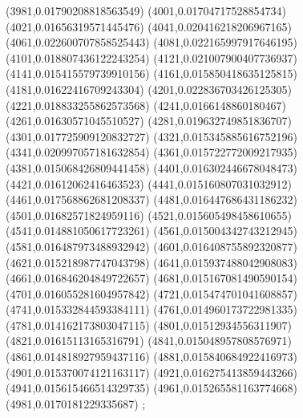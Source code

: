 {(3981,0.01790208818563549)
(4001,0.01704717528854734)
(4021,0.01656319571445476)
(4041,0.020416218206967165)
(4061,0.022600707858525443)
(4081,0.022165997917646195)
(4101,0.018807436122243254)
(4121,0.021007900407736937)
(4141,0.015415579739910156)
(4161,0.015850418635125815)
(4181,0.01622416709243304)
(4201,0.022836703426125305)
(4221,0.018833255862573568)
(4241,0.0166148860180467)
(4261,0.01630571045510527)
(4281,0.019632749851836707)
(4301,0.017725909120832727)
(4321,0.015345885616752196)
(4341,0.020997057181632854)
(4361,0.015722772009217935)
(4381,0.015068426809441458)
(4401,0.016302446678048473)
(4421,0.01612062416463523)
(4441,0.015160807031032912)
(4461,0.017568862681208337)
(4481,0.016447686431186232)
(4501,0.01682571824959116)
(4521,0.015605498458610655)
(4541,0.014881050617723261)
(4561,0.015004342743212945)
(4581,0.016487973488932942)
(4601,0.016408755892320877)
(4621,0.015218987747043798)
(4641,0.015937488042908083)
(4661,0.016846204849722657)
(4681,0.015167081490590154)
(4701,0.016055281604957842)
(4721,0.015474701041608857)
(4741,0.015332844593384111)
(4761,0.014960173722981335)
(4781,0.014162173803047115)
(4801,0.01512934556311907)
(4821,0.01615113165316791)
(4841,0.015048957808576971)
(4861,0.014818927959437116)
(4881,0.015840684922416973)
(4901,0.015370074121163117)
(4921,0.016275413859443266)
(4941,0.015615466514329735)
(4961,0.015265581163774668)
(4981,0.0170181229335687)
};
